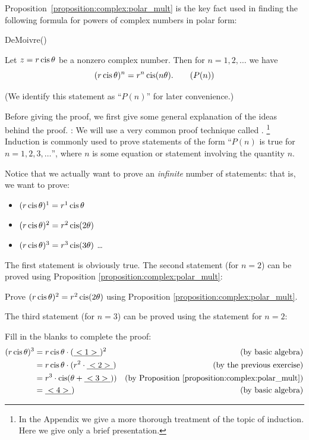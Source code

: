 \noindent
Proposition~\ref{proposition:complex:polar_mult} is the key fact used in finding the following formula for powers of complex numbers in polar form:

\begin{prop}{DeMoivre}() 

Let $z=r\operatorname{cis}\theta$ be a nonzero complex number. Then for $n=1,2,\ldots$ we have
\[ (r\operatorname{cis}\theta)^{n}=r^{n}\operatorname{cis}(n\theta).\tag{$P(n)$}\]
 \end{prop}
(We identify this statement as ``$P(n)$'' for later convenience.)

 Before giving the proof, we first give some general explanation of the ideas behind the proof.
\bigskip
\newline
{}:  We will use a very common proof technique called .
\footnote{In the Appendix we give a more thorough treatment of the topic of induction. Here we give only a brief presentation.}
 Induction is commonly used to prove statements of the form ``$P(n)$ is true for $n = 1,2,3,\ldots$'', where $n$ is some equation or statement involving the quantity $n$. 

Notice that we actually want to prove an \emph{infinite} number of statements: that is, we want to prove:
\begin{itemize}
\item 
$(r\operatorname{cis}\theta)^{1}=r^{1}\operatorname{cis}\theta$
\item
$(r\operatorname{cis}\theta)^{2}=r^{2}\operatorname{cis}(2\theta)$
\item
$(r\operatorname{cis}\theta)^{3}=r^{3}\operatorname{cis}(3\theta)$
\ldots
\end{itemize}

\noindent The first statement is obviously true. The second statement (for $n=2$) can be proved using Proposition
\ref{proposition:complex:polar_mult}:

\begin{exercise}{27} Prove $(r\operatorname{cis}\theta)^{2}=r^{2}\operatorname{cis}(2\theta)$ using Proposition
\ref{proposition:complex:polar_mult}.
\end{exercise}

The third statement (for $n=3$) can be proved using the statement for $n=2$:

\begin{exercise}{28} Fill in the blanks to complete the proof:
\begin{align*}
(r\cis\theta)^{3} &= r\cis\theta \cdot (\underline{~<1>~})^{2} & \text{(by basic algebra)} \\
 &=  r\cis\theta \cdot (r^{2} \cdot\underline{~<2>~}) & \text{(by the previous exercise)}\\
 &=  r^{3} \cdot \cis( \theta +  \underline{~<3>~})) & \mbox{(by Proposition \ref{proposition:complex:polar_mult})}\\
 &=   \underline{~<4>~}) & \mbox{(by basic algebra)}\\
\end{align*}
\end{exercise}

